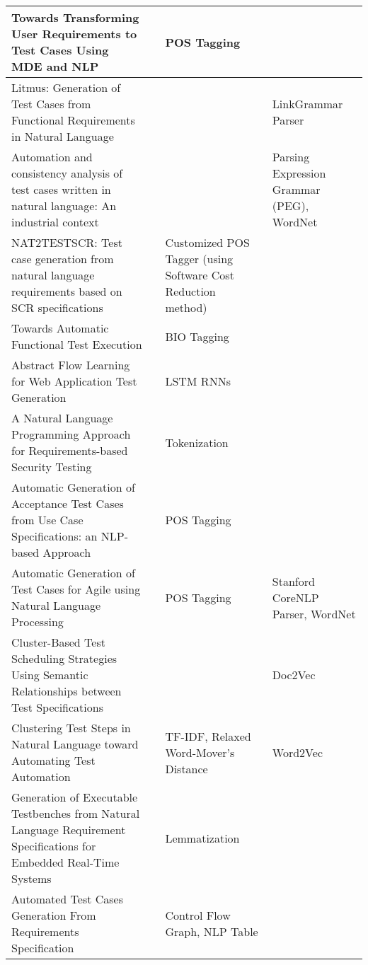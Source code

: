 \begin{longtable}{|p{4cm}|p{4cm}|p{4cm}|p{4cm}|}
            \hline Towards Transforming User Requirements to Test Cases Using MDE and NLP & \cite{allala2019towards} &  POS Tagging & \\
            \hline Litmus: Generation of Test Cases from Functional Requirements in Natural Language  & \cite{litmus} &  & LinkGrammar Parser\\
            \hline Automation and consistency analysis of test cases written in natural language: An industrial context & \cite{arruda2020automation} &   & Parsing Expression Grammar (PEG), WordNet\\
            \hline NAT2TESTSCR: Test case generation from natural language requirements based on SCR specifications  & \cite{carvalho2014nat2testscr} &  Customized POS Tagger (using Software Cost Reduction method) & \\
            \hline Towards Automatic Functional Test Execution & \cite{pedemonte2012towards} & BIO Tagging & \\
            \hline Abstract Flow Learning for Web Application Test Generation  & \cite{10.1145/3278186.3278194} & LSTM RNNs & \\
            \hline A Natural Language Programming Approach for Requirements-based Security Testing & \cite{mai2018natural} & Tokenization & \\
            \hline Automatic Generation of Acceptance Test Cases from Use Case Specifications: an NLP-based Approach & \cite{wang2020automatic} &  POS Tagging & \\
            \hline Automatic Generation of Test Cases for Agile using Natural Language Processing & \cite{rane2017automatic} & POS Tagging & Stanford CoreNLP Parser, WordNet\\
            \hline Cluster-Based Test Scheduling Strategies Using Semantic Relationships between Test Specifications & \cite{10.1145/3195538.3195540} &   & Doc2Vec\\
            \hline Clustering Test Steps in Natural Language toward Automating Test Automation & \cite{10.1145/3368089.3417067} & TF-IDF, Relaxed Word-Mover's Distance & Word2Vec\\
            \hline Generation of Executable Testbenches from Natural Language Requirement Specifications for Embedded Real-Time Systems & \cite{mueller2010generation} & Lemmatization & \\
            \hline Automated Test Cases Generation From Requirements Specification  & \cite{9491761} & Control Flow Graph, NLP Table & \\

\end{longtable}
